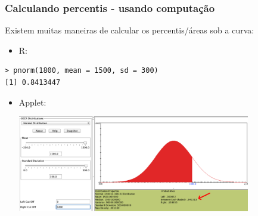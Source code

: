\begin{frame}[fragile]
\frametitle{Calculando percentis - usando computação}
\justifying
Existem muitas maneiras de calcular os percentis/áreas sob a curva:

\begin{itemize}
\item R:
\end{itemize}
\begin{beamerboxesrounded}[shadow = false, lower = code body]{}
{\small \begin{verbatim}
> pnorm(1800, mean = 1500, sd = 300)
[1] 0.8413447
\end{verbatim}
}
\end{beamerboxesrounded}
\begin{itemize}
\item Applet: {\small {}}
\begin{center}
\includegraphics[width=0.8\textwidth]{3-1_normal_distribution/applet.png}
\end{center}

\end{itemize}


\end{frame}


